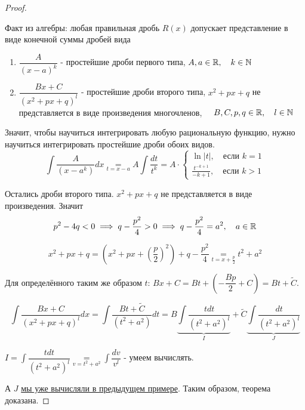\documentclass[../main.tex]{subfiles}
\begin{document}
\begin{proof}
    
    ~

    Факт из алгебры: любая правильная дробь \( R\left( x\right) \) допускает представление в виде конечной суммы дробей вида 
    \begin{enumerate}
        \item \( \dfrac{ A}{ \left( x-a\right)^k} \) - простейшие дроби первого типа, \( A,a \in \mathbb{R} ,\quad k \in \mathbb{N}\)
        \item \( \dfrac{ Bx+C}{ \left( x^2+px+q\right)^l} \) - простейшие дроби второго типа, \( x^2+px+q\) не представляется в виде произведения многочленов, \(\quad B,C,p,q \in \mathbb{R} ,\quad l \in \mathbb{N}\)
    \end{enumerate}

    Значит, чтобы научиться интегрировать любую рациональную функцию, нужно научиться интегрировать простейшие дроби обоих видов. 
    \begin{equation*}
        \displaystyle\int\limits_{ }^{ } \dfrac{ A}{ \left( x-a^k\right)}dx \underset{t=x-a}{=}A \displaystyle\int\limits_{ }^{ } \dfrac{ dt}{ t^k} = A \cdot 
        \begin{cases}
            \ln \left| t\right|,\quad \text{если } k = 1\\ 
            \frac{ t^{-k+1}}{ -k+1} ,\quad \text{если } k > 1
        \end{cases} 
    \end{equation*}

    Остались дроби второго типа. \( x^2+px+q\) не представляется в виде произведения. Значит 
    \[ p^2-4q<0 \implies q- \dfrac{ p^2}{ 4} > 0 \implies q- \dfrac{ p^2}{ 4} =a^2,\quad a \in \mathbb{R} \]

    \[ x^2+px+q=\left( x^2+px+ \left( \dfrac{ p}{ 2} \right)^2\right)+q- \dfrac{ p^2}{ 4} \underset{t=x+ \frac{ p}{ 2} }{=} t^2+a^2\]

    Для определённого таким же образом \( t\): \( Bx+C=Bt+\left( - \dfrac{ Bp}{ 2} +C\right)=Bt + \tilde{ C}\).

    \[ \displaystyle\int\limits_{ }^{ } \dfrac{ Bx+C}{ \left( x^2+px+q\right)^l} dx= \displaystyle\int\limits_{ }^{ } \dfrac{ Bt+\tilde{C}}{ \left( t^2+a^2\right)} dt=B \underbrace{\displaystyle\int\limits_{ }^{ } \dfrac{ tdt}{ \left( t^2+a^2\right)^l}}_I + \tilde{ C} \underbrace{\displaystyle\int\limits_{ }^{ } \dfrac{ dt}{ \left( t^2+a^2\right)^l}}_{J} \]

    \( I = \displaystyle\int\limits_{ }^{ } \dfrac{ tdt}{ \left( t^2+a^2\right)^l} \underset{v=t^2+a^2}{=} \displaystyle\int\limits_{ }^{ } \dfrac{ dv}{ v^l}\) - умеем вычислять. 

    А \( J\) \hyperlink{ex:int_recur}{мы уже вычисляли в предыдущем примере}. Таким образом, теорема доказана. 
\end{proof}
\end{document}
